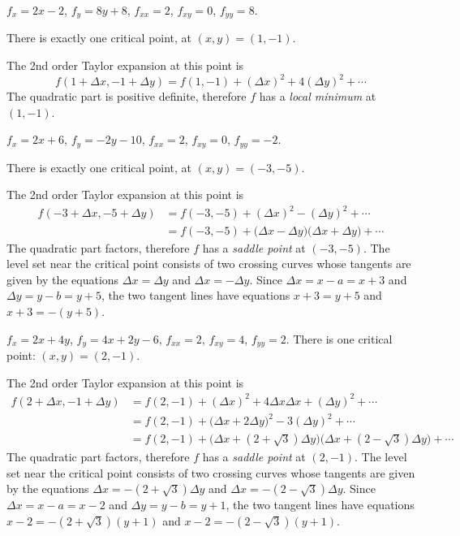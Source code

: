 \item[{\bfseries(V6.1a)}]

$f_x = 2x-2$, $f_y = 8y+8$, $f_{xx} = 2$, $f_{xy}=0$, $f_{yy}=8$.

There is exactly one critical point, at $(x, y) = (1,-1)$.

The 2nd order Taylor expansion at this point is
\[
f(1+\Delta x, -1+\Delta y) =
f(1, -1) + (\Delta x)^2 + 4(\Delta y)^2 +\cdots
\]
The quadratic part is positive definite, therefore $f$ has a
\emph{local minimum} at $(1, -1)$.
\bigskip

\item[{\bfseries(V6.1b)}]

$f_x = 2x+6$, $f_y = -2y-10$, $f_{xx} = 2$, $f_{xy}=0$, $f_{yy}=-2$.

There is exactly one critical point, at $(x, y) = (-3,-5)$.

The 2nd order Taylor expansion at this point is
\begin{align*}
  f(-3+\Delta x, -5+\Delta y)
  &= f(-3, -5) + (\Delta x)^2 - (\Delta y)^2 +\cdots \\
  &= f(-3, -5) +\bigl(\Delta x-\Delta y\bigr)\bigl(\Delta x +\Delta
  y\bigr)+\cdots
\end{align*}
The quadratic part factors, therefore $f$ has a
\emph{saddle point} at $(-3, -5)$.  The level set near the critical
point consists of two crossing curves whose tangents are given by the
equations $\Delta x=\Delta y$ and $\Delta x=-\Delta y$.  Since
$\Delta x=x-a=x+3$ and $\Delta y = y-b = y+5$, the two tangent lines
have equations $x+3 = y+5$ and $x+3 = -(y+5)$.
%

\bigskip

\item[{\bfseries(V6.1c)}]

$f_x = 2x+4y$, $f_y = 4x+2y-6$, $f_{xx} = 2$, $f_{xy}=4$, $f_{yy}=2$.
There is one critical point: $(x,y) = (2, -1)$.

The 2nd order Taylor expansion at this point is
\begin{align*}
f(2+\Delta x, -1+\Delta y)
&= f(2, -1) + (\Delta x)^2 + 4 \Delta x \Delta x
            + (\Delta y)^2 +\cdots\\
&= f(2, -1) + \bigl(\Delta x+2\Delta y\bigr)^{2}
            - 3(\Delta y)^2+\cdots\\
&= f(2, -1) + \bigl(\Delta x+(2+\surd3)\Delta y\bigr)
              \bigl(\Delta x+(2-\surd3)\Delta y\bigr)
            +\cdots
\end{align*}
%
The quadratic part factors, therefore $f$ has a
\emph{saddle point} at $(2, -1)$.  The level set near the critical
point consists of two crossing curves whose tangents are given by the
equations $\Delta x=-(2+\surd 3)\Delta y$ and $\Delta x=-(2-\surd
3)\Delta y$.  Since $\Delta x=x-a=x-2$ and $\Delta y = y-b = y+1$, the
two tangent lines have equations $x-2 = -(2+\surd3)(y+1)$ and
$x-2 = -(2-\surd3)(y+1)$.
\bigskip


